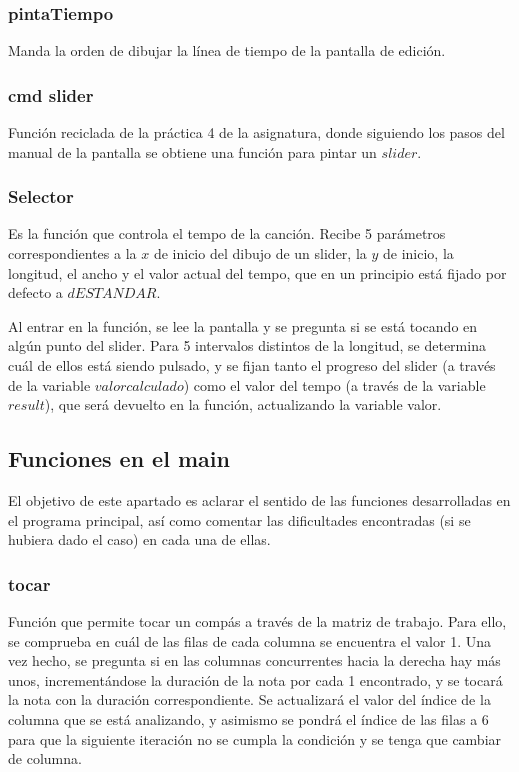 \documentclass[12pt,a4paper]{article}
\begin{document}
\subsubsection{pintaTiempo}
Manda la orden de dibujar la línea de tiempo de la pantalla de edición.

\subsubsection{cmd slider}
Función reciclada de la práctica 4 de la asignatura, donde siguiendo los pasos del manual de la pantalla se obtiene una función para pintar un $slider$.

\subsubsection{Selector}
Es la función que controla el tempo de la canción. Recibe 5 parámetros correspondientes a la $x$ de inicio del dibujo de un slider, la $y$ de inicio, la longitud, el ancho y el valor actual del tempo, que en un principio está fijado por defecto a $dESTANDAR$.

Al entrar en la función, se lee la pantalla y se pregunta si se está tocando en algún punto del slider. Para 5 intervalos distintos de la longitud, se determina cuál de ellos está siendo pulsado, y se fijan tanto el progreso del slider (a través de la variable $valorcalculado$) como el valor del tempo (a través de la variable $result$), que será devuelto en la función, actualizando la variable valor.

\subsection{Funciones en el main}
El objetivo de este apartado es aclarar el sentido de las funciones desarrolladas en el programa principal, así como comentar las dificultades encontradas (si se hubiera dado el caso) en cada una de ellas.

\subsubsection{tocar}
Función que permite tocar un compás a través de la matriz de trabajo. Para ello, se comprueba en cuál de las filas de cada columna se encuentra el valor 1. Una vez hecho, se pregunta si en las columnas concurrentes hacia la derecha hay más unos, incrementándose la duración de la nota por cada 1 encontrado, y se tocará la nota con la duración correspondiente. Se actualizará el valor del índice de la columna que se está analizando, y asimismo se pondrá el índice de las filas a 6 para que la siguiente iteración no se cumpla la condición y se tenga que cambiar de columna.
\end{document}
